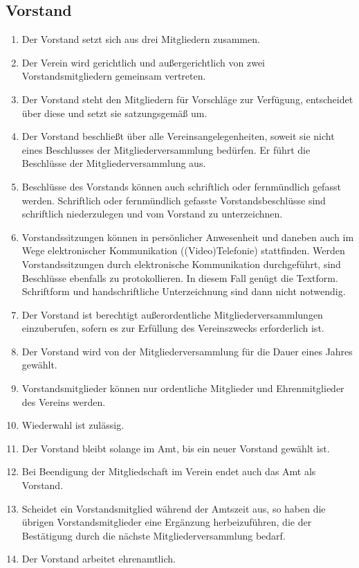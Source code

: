 \documentclass[12pt,a4paper,draft]{article}
\begin{document}
\subsection{Vorstand} %
\begin{enumerate}
\item Der Vorstand setzt sich aus drei Mitgliedern zusammen. %

\item Der Verein wird gerichtlich und außergerichtlich von zwei 
Vorstandsmitgliedern gemeinsam vertreten.

\item Der Vorstand steht den Mitgliedern für Vorschläge zur Verfügung, 
entscheidet über diese und setzt sie satzungsgemäß um.

\item Der Vorstand beschließt über alle Vereinsangelegenheiten, soweit sie 
nicht eines Beschlusses der Mitgliederversammlung bedürfen. Er führt die 
Beschlüsse der Mitgliederversammlung aus.

\item Beschlüsse des Vorstands können auch schriftlich oder fernmündlich 
gefasst werden. Schriftlich oder fernmündlich gefasste Vorstandsbeschlüsse 
sind schriftlich niederzulegen und vom Vorstand zu unterzeichnen.

\item Vorstandssitzungen können in persönlicher Anwesenheit und daneben auch im
Wege elektronischer Kommunikation ((Video)Telefonie) stattfinden. Werden Vorstandssitzungen
durch elektronische Kommunikation durchgeführt, sind Beschlüsse ebenfalls zu protokollieren.
In diesem Fall genügt die Textform. Schriftform und handschriftliche Unterzeichnung
sind dann nicht notwendig.

\item Der Vorstand ist berechtigt außerordentliche Mitgliederversammlungen 
einzuberufen, sofern es zur Erfüllung des Vereinszwecks erforderlich ist.

\item Der Vorstand wird von der Mitgliederversammlung für die Dauer eines 
Jahres gewählt.

\item Vorstandsmitglieder können nur ordentliche Mitglieder und Ehrenmitglieder 
des Vereins werden.

\item Wiederwahl ist zulässig.

\item Der Vorstand bleibt solange im Amt, bis ein neuer Vorstand gewählt ist.

\item Bei Beendigung der Mitgliedschaft im Verein endet auch das Amt als 
Vorstand.

\item Scheidet ein Vorstandsmitglied während der Amtszeit aus, so haben die 
übrigen Vorstandsmitglieder eine Ergänzung herbeizuführen, die der Bestätigung 
durch die nächste Mitgliederversammlung bedarf.

\item Der Vorstand arbeitet ehrenamtlich. %
\end{enumerate}
\end{document}
